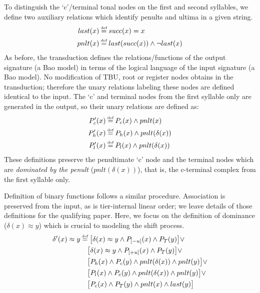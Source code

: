 \documentclass{article}
\newcommand\myeq{\mathrel{\stackrel{\makebox[0pt]{\mbox{\normalfont\tiny def}}}{=}}}
\newcommand{\ap}{\approx}
\begin{document}
To distinguish the `c'/terminal tonal nodes on the first and second syllables, we define two auxiliary relations which identify penults and ultima in a given string.
\begin{equation}
\begin{aligned}
last(x)&\myeq succ(x) = x \\
pnlt(x)&\myeq last(succ(x))\land \neg last(x) \\
\end{aligned}
\end{equation}
As before, the transduction defines the relations/functions of the output signature (a Bao model) in terms of the logical language of the input signature (a Bao model). No modification of TBU, root or register nodes obtains in the transduction; therefore the unary relations labeling these nodes are defined identical to the input. The `c' and terminal nodes from the first syllable only are generated in the output, so their unary relations are defined as: 
\begin{equation} \label{unary}
\begin{aligned}
P'_{c}(x)&\myeq P_{c}(x)\land pnlt(x) \\
P'_{h}(x)&\myeq P_{h}(x)\land pnlt(\delta(x)) \\ 
P'_{l}(x)&\myeq P_{l}(x)\land pnlt(\delta(x)) \\
\end{aligned}
\end{equation}
These definitions preserve the penultimate `c' node and the terminal nodes which are \emph{dominated by the penult} ($pnlt(\delta(x))$), that is, the c-terminal complex from the first syllable only. \par
Definition of binary functions follows a similar procedure. Association is preserved from the input, as is tier-internal linear order; we leave details of those definitions for the qualifying paper. Here, we focus on the definition of dominance ($\delta(x)\ap y$) which is crucial to modeling the shift process.
\begin{equation} \label{dominance}
\begin{aligned}
\delta'(x)\ap y&\myeq \big[\delta(x)\ap y\land P_{[-u]}(x)\land P_{T}(y)\big]\lor \\
&\quad\big[\delta(x)\ap y\land P_{[+u]}(x)\land P_{T}(y)\big]\lor \\
&\quad\big[P_{h}(x)\land P_{c}(y)\land pnlt(\delta(x)) \land pnlt(y)\big]\lor \\
&\quad\big[P_{l}(x)\land P_{c}(y)\land pnlt(\delta(x)) \land pnlt(y)\big]\lor \\
&\quad\big[P_{c}(x)\land P_{T}(y)\land pnlt(x) \land last(y)\big] \\
\end{aligned}
\end{equation}
\end{document}

